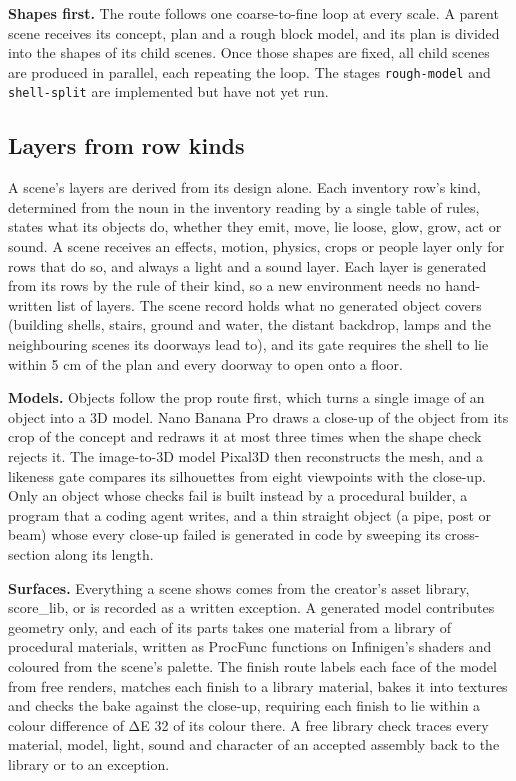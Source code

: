 \textbf{Shapes first.} The route follows one coarse-to-fine loop at every scale. A parent scene receives its concept, plan and a rough block model, and its plan is divided into the shapes of its child scenes. Once those shapes are fixed, all child scenes are produced in parallel, each repeating the loop. The stages \texttt{rough-model} and \texttt{shell-split} are implemented but have not yet run.

\subsection{Layers from row kinds}\label{layers-from-row-kinds}

A scene's layers are derived from its design alone. Each inventory row's kind, determined from the noun in the inventory reading by a single table of rules, states what its objects do, whether they emit, move, lie loose, glow, grow, act or sound. A scene receives an effects, motion, physics, crops or people layer only for rows that do so, and always a light and a sound layer. Each layer is generated from its rows by the rule of their kind, so a new environment needs no hand-written list of layers. The scene record holds what no generated object covers (building shells, stairs, ground and water, the distant backdrop, lamps and the neighbouring scenes its doorways lead to), and its gate requires the shell to lie within 5 cm of the plan and every doorway to open onto a floor.

\textbf{Models.} Objects follow the prop route first, which turns a single image of an object into a 3D model. Nano Banana Pro draws a close-up of the object from its crop of the concept and redraws it at most three times when the shape check rejects it. The image-to-3D model Pixal3D \citep{li2026pixal3d} then reconstructs the mesh, and a likeness gate compares its silhouettes from eight viewpoints with the close-up. Only an object whose checks fail is built instead by a procedural builder, a program that a coding agent writes, and a thin straight object (a pipe, post or beam) whose every close-up failed is generated in code by sweeping its cross-section along its length.

\textbf{Surfaces.} Everything a scene shows comes from the creator's asset library, score\_lib, or is recorded as a written exception. A generated model contributes geometry only, and each of its parts takes one material from a library of procedural materials, written as ProcFunc functions \citep{raistrick2026procfunc} on Infinigen's shaders \citep{raistrick2023infinigen} and coloured from the scene's palette. The finish route labels each face of the model from free renders, matches each finish to a library material, bakes it into textures and checks the bake against the close-up, requiring each finish to lie within a colour difference of ΔE 32 of its colour there. A free library check traces every material, model, light, sound and character of an accepted assembly back to the library or to an exception.

